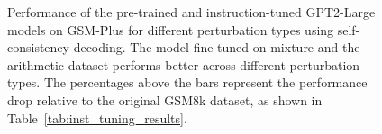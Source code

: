 \begin{figure}[t]
    \centering
    \resizebox{\linewidth}{!}{
        \Large\ttfamily
        
    }
    \caption{Performance of the pre-trained and instruction-tuned GPT2-Large models on GSM-Plus for different perturbation types using self-consistency decoding. The model fine-tuned on \tulu{} mixture and the arithmetic dataset performs better across different perturbation types. The percentages above the bars represent the performance drop relative to the original GSM8k dataset, as shown in Table~\ref{tab:inst_tuning_results}.}
    \label{fig:gsm_plus_accuracy}
\end{figure}
